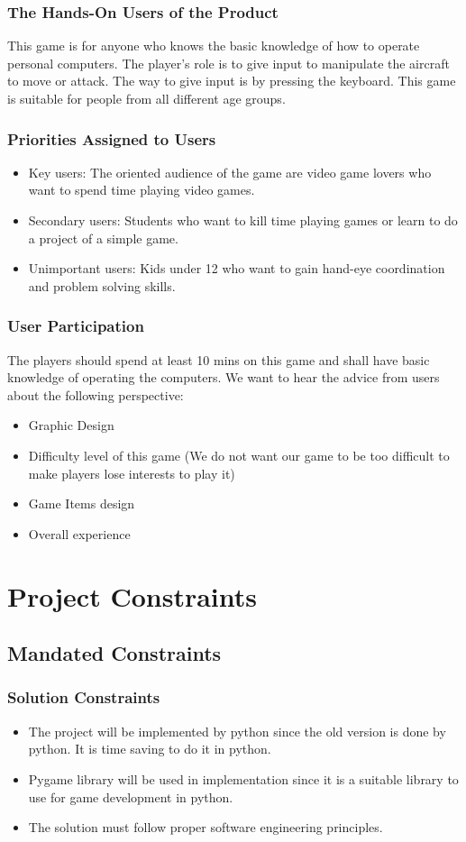\documentclass[12pt]{article}
\begin{document}
\subsubsection{The Hands-On Users of the Product}
This game is for anyone who knows the basic knowledge of how to operate personal computers. The player’s role is to give input to manipulate the aircraft to move or attack. The way to give input is by pressing the keyboard. This game is suitable for people from all different age groups.
\subsubsection{Priorities Assigned to Users}
\begin{itemize}
\item Key users: The oriented audience of the game are video game lovers  who want to spend time playing video games.
\item Secondary users: Students who want to kill time playing games or learn to do a project of a simple game.
\item Unimportant users: Kids under 12 who want to gain hand-eye coordination and problem solving skills.
\end{itemize}
\subsubsection{User Participation}
The players should spend at least 10 mins on this game and shall have basic knowledge of operating the computers. We want to
hear the advice from users about the following perspective:
\begin{itemize}
\item Graphic Design
\item Difficulty level of this game (We do not want our game
to be too difficult to make players lose interests to play it)
\item Game Items design
\item Overall experience
\end{itemize}
\section{Project Constraints}
\subsection{Mandated Constraints}
\subsubsection{Solution Constraints}
\begin{itemize}
\item The project will be implemented by python since the old version is done by python. It is time saving to do it in python.
\item Pygame library will be used in implementation since it
is a suitable library to use for game development in python.
\item The solution must follow proper software engineering
principles.
\end{itemize}
\end{document}

